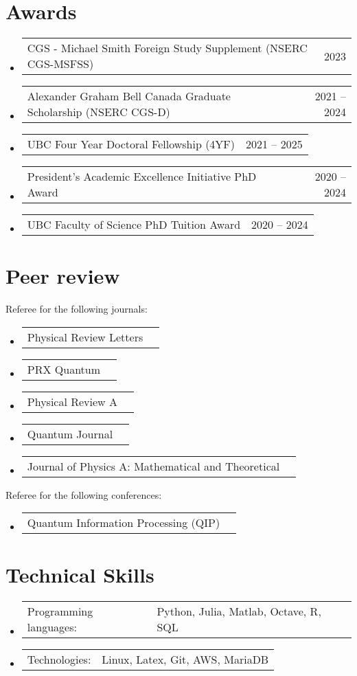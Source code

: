 \documentclass[letterpaper,11pt]{article}
\makeatletter
\newcommand{\AwardsItem}[2]{
	\item{\vspace{-1pt}
		\begin{tabular*}{0.97\textwidth}{l@{\extracolsep{\fill}}r}
			{#1} & {#2}
		\end{tabular*}
		\vspace{-5pt}
	}
}
\newcommand{\SkillsItem}[2]{
	\item{\vspace{-1pt}
		\begin{tabular*}{0.97\textwidth}{l l}
			{#1:} & {#2}
		\end{tabular*}
		\vspace{-5pt}
	}
}
\makeatother
\begin{document}
\section*{Awards}
\begin{itemize}[leftmargin=*]
	\AwardsItem{CGS - Michael Smith Foreign Study Supplement (NSERC CGS-MSFSS)}{2023}
	\AwardsItem{Alexander Graham Bell Canada Graduate Scholarship (NSERC CGS-D)}{2021 -- 2024}
	\AwardsItem{UBC Four Year Doctoral Fellowship (4YF)}{2021 -- 2025}
	\AwardsItem{President's Academic Excellence Initiative PhD Award}{2020 -- 2024}
	\AwardsItem{UBC Faculty of Science PhD Tuition Award }{2020 -- 2024}
\end{itemize}

\section*{Peer review}
Referee for the following journals:\vspace{-2mm}
\begin{itemize}[leftmargin=*]
	\AwardsItem{Physical Review Letters}{}
	\AwardsItem{PRX Quantum}{}
	\AwardsItem{Physical Review A}{}
	\AwardsItem{Quantum Journal}{}
	\AwardsItem{Journal of Physics A: Mathematical and Theoretical}{}
\end{itemize}
Referee for the following conferences:\vspace{-2mm}
\begin{itemize}[leftmargin=*]
	\AwardsItem{Quantum Information Processing (QIP)}{}
\end{itemize}


\section*{Technical Skills}
\begin{itemize}[leftmargin=*]
	\SkillsItem{Programming languages}{Python, Julia, Matlab, Octave, R, SQL}
	\SkillsItem{Technologies}{Linux, Latex, Git, AWS, MariaDB}
\end{itemize}
\end{document}
